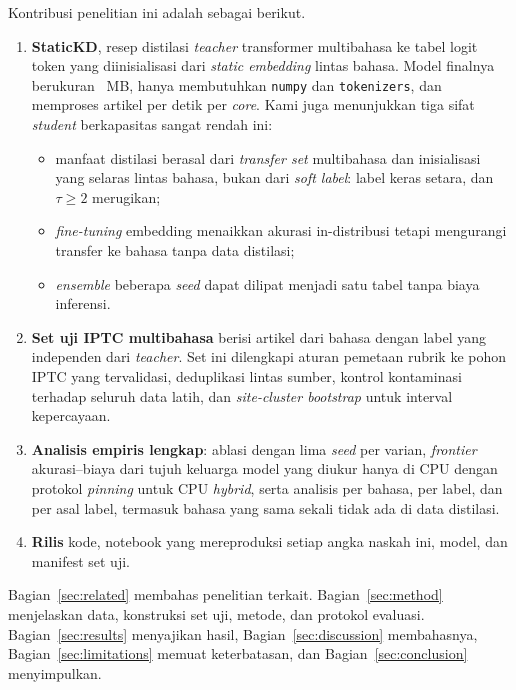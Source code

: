 \documentclass[journal]{IEEEtran}
\newcommand{\eng}[1]{\textit{#1}}   %
\begin{document}
Kontribusi penelitian ini adalah sebagai berikut.
\begin{enumerate}
  \item \textbf{StaticKD}, resep distilasi \eng{teacher} transformer multibahasa ke tabel logit token yang diinisialisasi dari \eng{static embedding} lintas bahasa. Model finalnya berukuran ~MB, hanya membutuhkan \texttt{numpy} dan \texttt{tokenizers}, dan memproses  artikel per detik per \eng{core}. Kami juga menunjukkan tiga sifat \eng{student} berkapasitas sangat rendah ini:
  \begin{itemize}
    \item manfaat distilasi berasal dari \eng{transfer set} multibahasa dan inisialisasi yang selaras lintas bahasa, bukan dari \eng{soft label}: label keras setara, dan $\tau\ge 2$ merugikan;
    \item \eng{fine-tuning} embedding menaikkan akurasi in-distribusi tetapi mengurangi transfer ke bahasa tanpa data distilasi;
    \item \eng{ensemble} beberapa \eng{seed} dapat dilipat menjadi satu tabel tanpa biaya inferensi.
  \end{itemize}
  \item \textbf{Set uji IPTC multibahasa} berisi  artikel dari  bahasa dengan label yang independen dari \eng{teacher}. Set ini dilengkapi aturan pemetaan rubrik ke pohon IPTC yang tervalidasi, deduplikasi lintas sumber, kontrol kontaminasi terhadap seluruh data latih, dan \eng{site-cluster bootstrap} untuk interval kepercayaan.
  \item \textbf{Analisis empiris lengkap}: ablasi dengan lima \eng{seed} per varian, \eng{frontier} akurasi--biaya dari tujuh keluarga model yang diukur hanya di CPU dengan protokol \eng{pinning} untuk CPU \eng{hybrid}, serta analisis per bahasa, per label, dan per asal label, termasuk bahasa yang sama sekali tidak ada di data distilasi.
  \item \textbf{Rilis} kode, notebook yang mereproduksi setiap angka naskah ini, model, dan manifest set uji.
\end{enumerate}

Bagian~\ref{sec:related} membahas penelitian terkait. Bagian~\ref{sec:method} menjelaskan data, konstruksi set uji, metode, dan protokol evaluasi. Bagian~\ref{sec:results} menyajikan hasil, Bagian~\ref{sec:discussion} membahasnya, Bagian~\ref{sec:limitations} memuat keterbatasan, dan Bagian~\ref{sec:conclusion} menyimpulkan.
\end{document}
